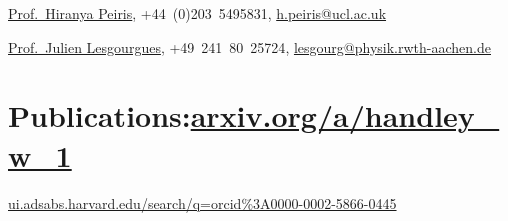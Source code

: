 \documentclass[11pt,a4paper,sans]{moderncv}
\begin{document}
\href{https://www.ucl.ac.uk/cosmoparticle/hiranya-peiris}{Prof.\ Hiranya Peiris}, {+44~(0)203~5495831}, \href{mailto:h.peiris@ucl.ac.uk}{h.peiris@ucl.ac.uk} 

\href{https://www.particle-theory.rwth-aachen.de/go/id/gufe/lidx/1}{Prof.\ Julien Lesgourgues}, {+49~241~80~25724}, \href{mailto:lesgourg@physik.rwth-aachen.de}{lesgourg@physik.rwth-aachen.de} 


\pagebreak
\section{Publications:\hfill  \href{https://www.arxiv.org/a/handley_w_1.html}{arxiv.org/a/handley\_w\_1}}

\hfill \href{https://ui.adsabs.harvard.edu/search/q=orcid\%3A0000-0002-5866-0445}{ui.adsabs.harvard.edu/search/q=orcid\%3A0000-0002-5866-0445}

\vspace{-10pt}

{\small
}
\end{document}
